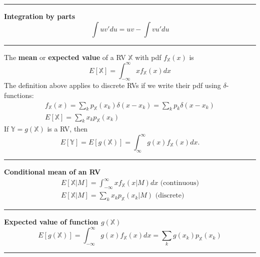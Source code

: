 \documentclass{article}
\providecommand{\X}{\mathbb{X}}
\providecommand{\Y}{\mathbb{Y}}
\begin{document}
\begin{multicols*}{3}
        \noindent\rule{\columnwidth}{0.4pt}

        \textbf{Integration by parts}
        \begin{equation*}
            \int u v' du = uv - \int v u' du
        \end{equation*}

        \noindent\rule{\columnwidth}{0.4pt}

        The \textbf{mean} or \textbf{expected value} of a RV $\X$ with pdf $f_\X(x)$ is
        \begin{equation*}
            E[\X] = \int_{-\infty}^{\infty}  xf_{\X}(x)dx
        \end{equation*}
        The definition above applies to discrete RVs if we write their pdf using $\delta$-functions:
        \begin{equation*}
            \begin{gathered}
                f_{\X}(x) = \sum_k p_\X(x_k)\delta(x-x_k) = \sum_{k}p_k\delta(x-x_k)\\
                E[\X] = \sum_k x_k p_{\X}(x_k)
            \end{gathered}
        \end{equation*}
        If $\Y=g(\X)$ is a RV, then
        \begin{equation*}
            E[\Y] = E[g(\X)] = \int_{\infty}^{\infty} g(x) f_{\X}(x)dx.
        \end{equation*}

        \noindent\rule{\columnwidth}{0.4pt}

        \textbf{Conditional mean of an RV}
        \begin{equation*}
            \begin{gathered}
                E[\X|M] = \int_{-\infty}^{\infty} xf_{\X}(x|M)dx \text{ (continuous)}\\
                E[\X|M] = \sum_k x_k p_{\X}(x_k|M) \text{ (discrete)}
            \end{gathered}
        \end{equation*}

        \noindent\rule{\columnwidth}{0.4pt}

        \textbf{Expected value of function $g(\X)$}
        \begin{equation*}
            E[g(\X)] = \int_{-\infty}^{\infty} g(x)f_{\X}(x)dx = \sum_k g(x_k)p_{\X}(x_k)
        \end{equation*}

        \noindent\rule{\columnwidth}{0.4pt}


\end{multicols*}
\end{document}

